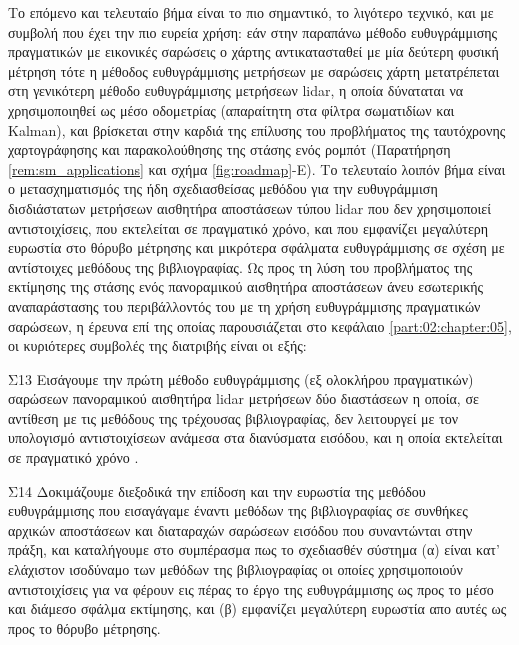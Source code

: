 Το επόμενο και τελευταίο βήμα είναι το πιο σημαντικό, το λιγότερο τεχνικό, και
με συμβολή που έχει την πιο ευρεία χρήση: εάν στην παραπάνω μέθοδο
ευθυγράμμισης πραγματικών με εικονικές σαρώσεις ο χάρτης αντικατασταθεί με μία
δεύτερη φυσική μέτρηση τότε η μέθοδος ευθυγράμμισης μετρήσεων με σαρώσεις χάρτη
μετατρέπεται στη γενικότερη μέθοδο ευθυγράμμισης μετρήσεων lidar, η οποία
δύναταται να χρησιμοποιηθεί ως μέσο οδομετρίας (απαραίτητη στα φίλτρα
σωματιδίων και Kalman), και βρίσκεται στην καρδιά της επίλυσης του προβλήματος
της ταυτόχρονης χαρτογράφησης και παρακολούθησης της στάσης ενός ρομπότ
(Παρατήρηση \ref{rem:sm_applications} και σχήμα \ref{fig:roadmap}-Ε). Το
τελευταίο λοιπόν βήμα είναι ο μετασχηματισμός της ήδη σχεδιασθείσας μεθόδου για
την ευθυγράμμιση δισδιάστατων μετρήσεων αισθητήρα αποστάσεων τύπου lidar που
δεν χρησιμοποιεί αντιστοιχίσεις, που εκτελείται σε πραγματικό χρόνο, και που
εμφανίζει μεγαλύτερη ευρωστία στο θόρυβο μέτρησης και μικρότερα σφάλματα
ευθυγράμμισης σε σχέση με αντίστοιχες μεθόδους της βιβλιογραφίας. Ως προς τη
λύση του προβλήματος της εκτίμησης της στάσης ενός πανοραμικού αισθητήρα
αποστάσεων άνευ εσωτερικής αναπαράστασης του περιβάλλοντός του με τη χρήση
ευθυγράμμισης πραγματικών σαρώσεων, η έρευνα επί της οποίας παρουσιάζεται στο
κεφάλαιο \ref{part:02:chapter:05}, οι κυριότερες συμβολές της διατριβής είναι
οι εξής:

\begin{bw_box}
\begin{customcontribution}{Σ13}
  \label{contribution:13}
  Εισάγουμε την πρώτη μέθοδο ευθυγράμμισης (εξ ολοκλήρου πραγματικών) σαρώσεων
  πανοραμικού αισθητήρα lidar μετρήσεων δύο διαστάσεων η οποία, σε αντίθεση με
  τις μεθόδους της τρέχουσας βιβλιογραφίας, δεν λειτουργεί με τον υπολογισμό
  αντιστοιχίσεων ανάμεσα στα διανύσματα εισόδου, και η οποία εκτελείται σε
  πραγματικό χρόνο \cite{Filotheou2022i}.
\end{customcontribution}
\end{bw_box}

\begin{bw_box}
\begin{customcontribution}{Σ14}
  \label{contribution:14}
  Δοκιμάζουμε διεξοδικά την επίδοση και την ευρωστία της μεθόδου ευθυγράμμισης
  που εισαγάγαμε έναντι μεθόδων της βιβλιογραφίας σε συνθήκες αρχικών
  αποστάσεων και διαταραχών σαρώσεων εισόδου που συναντώνται στην πράξη, και
  καταλήγουμε στο συμπέρασμα πως το σχεδιασθέν σύστημα (α) είναι κατ' ελάχιστον
  ισοδύναμο των μεθόδων της βιβλιογραφίας οι οποίες χρησιμοποιούν
  αντιστοιχίσεις για να φέρουν εις πέρας το έργο της ευθυγράμμισης ως προς το
  μέσο και διάμεσο σφάλμα εκτίμησης, και (β) εμφανίζει μεγαλύτερη ευρωστία απο
  αυτές ως προς το θόρυβο μέτρησης.
\end{customcontribution}
\end{bw_box}
